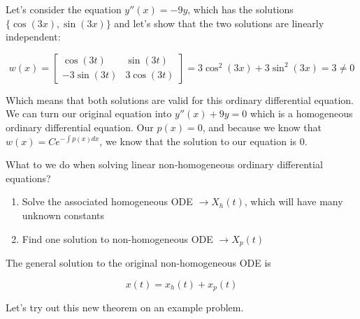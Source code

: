   \begin{eg}
    Let's consider the equation $y''(x)=-9y$, which has the solutions $\{\cos(3x),\sin(3x)\}$ and let's show that the two solutions are linearly independent:

  \[
    w(x)=\begin{bmatrix} \cos(3t)&\sin(3t)\\-3\sin(3t)&3\cos(3t) \end{bmatrix}
    =3\cos^2(3x)+3\sin^2(3x)=3\neq0
  \]
  
  Which means that both solutions are valid for this ordinary differential equation. We can turn our original equation into $y''(x)+9y=0$ which is a homogeneous ordinary differential equation. Our $p(x)=0$, and because we know that $w(x)=Ce^{-\int p(x)dx}$, we know that the solution to our equation is 0.
  \end{eg}

  \begin{theorem}
    What to we do when solving linear non-homogeneous ordinary differential equations?
    \begin{enumerate}
      \item Solve the associated homogeneous ODE $\to X_h(t)$, which will have many unknown constants
      \item Find one solution to non-homogeneous ODE $\to X_p(t)$
    \end{enumerate}

    The general solution to the original non-homogeneous ODE is 

    \[
      x(t)=x_h(t)+x_p(t)
    \]
  \end{theorem}

  Let's try out this new theorem on an example problem.

